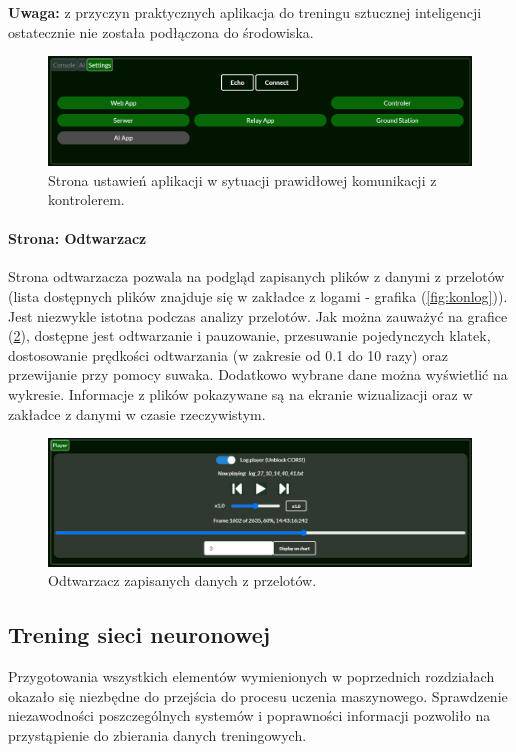 \documentclass[12pt, a4paper]{article}
\let\oldref\ref
\renewcommand{\ref}[1]{(\oldref{#1})}
\begin{document}
\textbf{Uwaga:} z przyczyn praktycznych aplikacja do treningu sztucznej inteligencji ostatecznie nie została podłączona do środowiska.

 \begin{figure}[H]
    \centering
    \includegraphics[width=1\textwidth]{settings}
    \caption{Strona ustawień aplikacji w sytuacji prawidłowej komunikacji z kontrolerem.}
    \label{fig:settings}
\end{figure}

\paragraph{Strona: Odtwarzacz}\mbox{}

Strona odtwarzacza pozwala na podgląd zapisanych plików z danymi z przelotów (lista dostępnych plików znajduje się w zakładce z logami - grafika \ref{fig:konlog}). Jest niezwykle istotna podczas analizy przelotów. Jak można zauważyć na grafice \ref{fig:player}, dostępne jest odtwarzanie i pauzowanie, przesuwanie pojedynczych klatek, dostosowanie prędkości odtwarzania (w zakresie od 0.1 do 10 razy) oraz przewijanie przy pomocy suwaka. Dodatkowo wybrane dane można wyświetlić na wykresie. Informacje z plików pokazywane są na ekranie wizualizacji oraz w zakładce z danymi w czasie rzeczywistym.

 \begin{figure}[H]
    \centering
    \includegraphics[width=1\textwidth]{player}
    \caption{Odtwarzacz zapisanych danych z przelotów.}
    \label{fig:player}
\end{figure}

\FloatBarrier
\subsection{Trening sieci neuronowej}
Przygotowania wszystkich elementów wymienionych w poprzednich rozdziałach okazało się niezbędne do przejścia do procesu uczenia maszynowego. Sprawdzenie niezawodności poszczególnych systemów i poprawności informacji pozwoliło na przystąpienie do zbierania danych treningowych.
\end{document}
